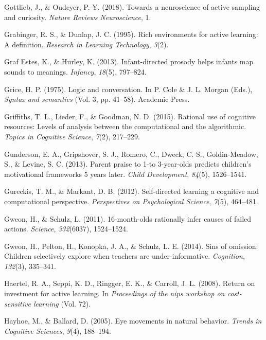 \documentclass[oneside]{report}
\begin{document}
\hypertarget{ref-gottlieb2018towards}{}
Gottlieb, J., \& Oudeyer, P.-Y. (2018). Towards a neuroscience of active
sampling and curiosity. \emph{Nature Reviews Neuroscience}, 1.

\hypertarget{ref-grabinger1995rich}{}
Grabinger, R. S., \& Dunlap, J. C. (1995). Rich environments for active
learning: A definition. \emph{Research in Learning Technology},
\emph{3}(2).

\hypertarget{ref-graf2013infant}{}
Graf Estes, K., \& Hurley, K. (2013). Infant-directed prosody helps
infants map sounds to meanings. \emph{Infancy}, \emph{18}(5), 797--824.

\hypertarget{ref-grice1975}{}
Grice, H. P. (1975). Logic and conversation. In P. Cole \& J. L. Morgan
(Eds.), \emph{Syntax and semantics} (Vol. 3, pp. 41--58). Academic
Press.

\hypertarget{ref-griffiths2015rational}{}
Griffiths, T. L., Lieder, F., \& Goodman, N. D. (2015). Rational use of
cognitive resources: Levels of analysis between the computational and
the algorithmic. \emph{Topics in Cognitive Science}, \emph{7}(2),
217--229.

\hypertarget{ref-gunderson2013parent}{}
Gunderson, E. A., Gripshover, S. J., Romero, C., Dweck, C. S.,
Goldin-Meadow, S., \& Levine, S. C. (2013). Parent praise to 1-to
3-year-olds predicts children's motivational frameworks 5 years later.
\emph{Child Development}, \emph{84}(5), 1526--1541.

\hypertarget{ref-gureckis2012self}{}
Gureckis, T. M., \& Markant, D. B. (2012). Self-directed learning a
cognitive and computational perspective. \emph{Perspectives on
Psychological Science}, \emph{7}(5), 464--481.

\hypertarget{ref-gweon201116}{}
Gweon, H., \& Schulz, L. (2011). 16-month-olds rationally infer causes
of failed actions. \emph{Science}, \emph{332}(6037), 1524--1524.

\hypertarget{ref-gweon2014sins}{}
Gweon, H., Pelton, H., Konopka, J. A., \& Schulz, L. E. (2014). Sins of
omission: Children selectively explore when teachers are
under-informative. \emph{Cognition}, \emph{132}(3), 335--341.

\hypertarget{ref-haertel2008return}{}
Haertel, R. A., Seppi, K. D., Ringger, E. K., \& Carroll, J. L. (2008).
Return on investment for active learning. In \emph{Proceedings of the
nips workshop on cost-sensitive learning} (Vol. 72).

\hypertarget{ref-hayhoe2005eye}{}
Hayhoe, M., \& Ballard, D. (2005). Eye movements in natural behavior.
\emph{Trends in Cognitive Sciences}, \emph{9}(4), 188--194.
\end{document}
